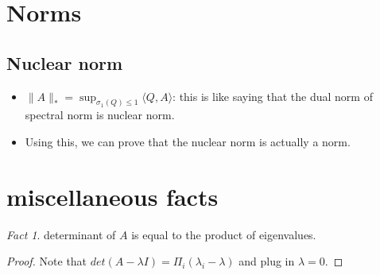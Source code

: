 \documentclass[11pt,reqno]{amsart}
\theoremstyle{remark}
\newtheorem{fact}{Fact}
\begin{document}
\section{Norms}
\subsection{Nuclear norm}
\begin{itemize}
\item $\lVert A\rVert_*=\sup_{\sigma_1(Q)\leq 1}\langle Q,A\rangle$: this is like saying that the dual norm of spectral norm is nuclear norm.
\item Using this, we can prove that the nuclear norm is actually a norm.
\end{itemize}
\section{miscellaneous facts}
\begin{fact}
determinant of $A$ is equal to the product of eigenvalues.
\end{fact}
\begin{proof}
Note that $det(A-\lambda I) = \Pi_i (\lambda_i -\lambda)$ and plug in $\lambda = 0$.
\end{proof}
\end{document}
